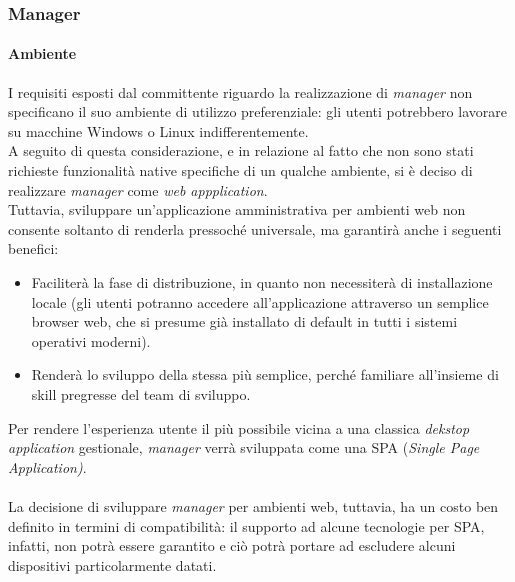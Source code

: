 \documentclass[12pt]{article}
\begin{document}
\subsubsection{Manager}
\paragraph{Ambiente}
I requisiti esposti dal committente riguardo la realizzazione di \textit{manager} non specificano il suo ambiente di utilizzo preferenziale: gli utenti potrebbero lavorare su macchine Windows o Linux indifferentemente.\\
A seguito di questa considerazione, e in relazione al fatto che non sono stati richieste funzionalità native specifiche di un qualche ambiente, si è deciso di realizzare \textit{manager} come \textit{web appplication}.\\
Tuttavia, sviluppare un'applicazione amministrativa per ambienti web  non consente soltanto di renderla pressoché universale, ma garantirà anche i seguenti benefici:
\begin{itemize}
\item Faciliterà la fase di distribuzione, in quanto non necessiterà di installazione locale (gli utenti potranno accedere all'applicazione attraverso un semplice browser web, che si presume già installato di default in tutti i sistemi operativi moderni).
 \item Renderà lo sviluppo della stessa più semplice, perché familiare all'insieme di skill pregresse del team di sviluppo.
\end{itemize}
Per rendere l'esperienza utente il più possibile vicina a una classica \textit{dekstop application} gestionale, \textit{manager} verrà sviluppata come una SPA (\textit{Single Page Application)}.\\\\
La decisione di sviluppare \textit{manager} per ambienti web, tuttavia, ha un costo ben definito in termini di compatibilità: il supporto ad alcune tecnologie per SPA, infatti, non potrà essere garantito  e ciò potrà portare ad escludere alcuni dispositivi particolarmente datati.
\end{document}
